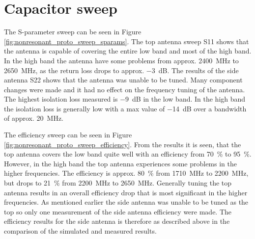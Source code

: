 \FloatBarrier
\section{Capacitor sweep}
The S-parameter sweep can be seen in Figure \ref{fig:nonresonant_proto_sweep_sparams}. The top antenna sweep S11 shows that the antenna is capable of covering the entire low band and most of the high band. In the high band the antenna have some problems from approx. \SI{2400}{MHz} to \SI{2650}{MHz}, as the return loss drops to approx. \SI{-3}{dB}. The results of the side antenna S22 shows that the antenna was unable to be tuned. Many component changes were made and it had no effect on the frequency tuning of the antenna. 
The highest isolation loss measured is \SI{-9}{dB} in the low band. In the high band the isolation loss is generally low with a max value of \SI{-14}{dB} over a bandwidth of approx. \SI{20}{MHz}. 

The efficiency sweep can be seen in Figure \ref{fig:nonresonant_proto_sweep_efficiency}. From the results it is seen, that the top antenna covers the low band quite well with an efficiency from \SI{70}{\percent} to \SI{95}{\percent}. However, in the high band the top antenna experiences some problems in the higher frequencies. The efficiency is approx. \SI{80}{\percent} from \SI{1710}{MHz} to \SI{2200}{MHz}, but drops to \SI{21}{\percent} from \SI{2200}{MHz} to \SI{2650}{MHz}. Generally tuning the top antenna results in an overall efficiency drop that is most significant in the higher frequencies.
As mentioned earlier the side antenna was unable to be tuned as the top so only one measurement of the side antenna efficiency were made. The efficiency results for the side antenna is therefore as described above in the comparison of the simulated and measured results.

